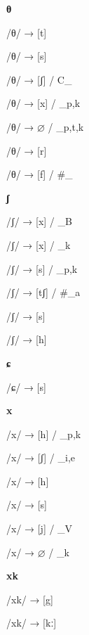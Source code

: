 \begin{center}\textbf{θ}\end{center}
\begin{multicols}{4}
\noindent /θ/ → [t]

\noindent /θ/ → [s]

\noindent /θ/ → [ʃ] / C\_

\noindent /θ/ → [x] / \_{p,k}

\noindent /θ/ → $\varnothing$ / \_{p,t,k}

\noindent /θ/ → [r]

\noindent /θ/ → [f] / \#\_

\end{multicols}

\begin{center}\textbf{ʃ}\end{center}
\begin{multicols}{4}
\noindent /ʃ/ → [x] / \_B

\noindent /ʃ/ → [x] / \_k

\noindent /ʃ/ → [s] / \_{p,k}

\noindent /ʃ/ → [tʃ] / \#\_a

\noindent /ʃ/ → [s]

\noindent /ʃ/ → [h]

\end{multicols}

\begin{center}\textbf{ɕ}\end{center}
\begin{multicols}{4}
\noindent /ɕ/ → [s]

\end{multicols}

\begin{center}\textbf{x}\end{center}
\begin{multicols}{4}
\noindent /x/ → [h] / \_{p,k}

\noindent /x/ → [ʃ] / \_{i,e}

\noindent /x/ → [h]

\noindent /x/ → [s]

\noindent /x/ → [j] / \_V

\noindent /x/ → $\varnothing$ / \_k

\end{multicols}

\begin{center}\textbf{xk}\end{center}
\begin{multicols}{4}
\noindent /xk/ → [g]

\noindent /xk/ → [kː]

\end{multicols}

